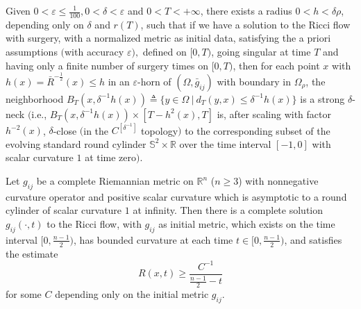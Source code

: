 \begin{lemma}
  \label{lem:cz-cutoff-neck-existence-in-horns}

Given $0<\varepsilon \leq \frac{1}{100}, 0<\delta<\varepsilon$ and
$0<T<+\infty$, there exists a radius $0<h<\delta\rho$, depending
only on $\delta$ and $r(T)$, such that if we have a solution to
the Ricci flow with surgery, with a normalized metric as initial
data, satisfying the a priori assumptions $($with accuracy
$\varepsilon),$ defined on $[0,T)$, going singular at time $T$ and
having only a finite number of surgery times on $[0,T)$, then for
each point $x$ with $h(x)=\bar{R}^{-\frac{1}{2}}(x)\leq h$ in an
$\varepsilon$-horn of $(\Omega,\bar{g}_{ij})$ with boundary in
$\Omega_\rho$, the neighborhood
$B_T(x,\delta^{-1}h(x))\triangleq\{y\in\Omega\ |\ d_T(y,x)\leq
\delta^{-1}h(x)\}$ is a strong $\delta$-neck $($i.e.,
$B_T(x,\delta^{-1}h(x)) \times [T-h^2(x),T]$ is, after scaling
with factor $h^{-2}(x)$, $\delta$-close $($in the
$C^{[\delta^{-1}]}$ topology$)$ to the corresponding subset of the
evolving standard round cylinder $\mathbb{S}^2 \times \mathbb{R}$
over the time interval $[-1,0]$ with scalar curvature $1$ at time
zero$)$.
\end{lemma}
\begin{proposition}
  \label{prop:cz-asymptotically-cylindrical-standard-solution}

Let $g_{ij}$ be a complete Riemannian metric on $\mathbb{R}^{n}$
($n \geq 3$) with nonnegative curvature operator and positive
scalar curvature which is asymptotic to a round cylinder of scalar
curvature $1$ at infinity.  Then there is a complete solution
$g_{ij}({\cdot,t})$ to the Ricci flow, with $g_{ij}$ as initial
metric, which exists on the time interval $[0,\frac{n-1}{2})$, has
bounded curvature at each time $t \in [0,\frac{n-1}{2})$, and
satisfies the estimate
$$
  R(x,t)\geq \frac{C^{-1}}{\frac{n-1}{2}-t}
$$
for some $C$ depending only on the initial metric $g_{ij}$.
\end{proposition}
